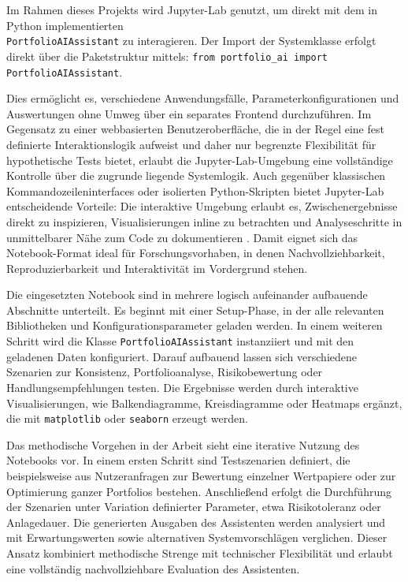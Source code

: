     Im Rahmen dieses Projekts wird Jupyter-Lab genutzt, um direkt mit dem in Python implementierten\\ \texttt{PortfolioAIAssistant} zu interagieren.
    Der Import der Systemklasse erfolgt direkt über die Paketstruktur mittels: \lstinline[columns=fixed]{from portfolio_ai import PortfolioAIAssistant}.

    Dies ermöglicht es, verschiedene Anwendungsfälle, Parameterkonfigurationen und Auswertungen ohne Umweg über ein separates Frontend durchzuführen.
    Im Gegensatz zu einer webbasierten Benutzeroberfläche, die in der Regel eine fest definierte Interaktionslogik aufweist und daher nur begrenzte Flexibilität für hypothetische Tests bietet, erlaubt die Jupyter-Lab-Umgebung eine vollständige Kontrolle über die zugrunde liegende Systemlogik.
    Auch gegenüber klassischen Kommandozeileninterfaces oder isolierten Python-Skripten bietet Jupyter-Lab entscheidende Vorteile:
    Die interaktive Umgebung erlaubt es, Zwischenergebnisse direkt zu inspizieren, Visualisierungen inline zu betrachten und Analyseschritte in unmittelbarer Nähe zum Code zu dokumentieren \autocite[S. 87 und 88]{kluyver2016jupyter}.
    Damit eignet sich das Notebook-Format ideal für Forschungsvorhaben, in denen Nachvollziehbarkeit, Reproduzierbarkeit und Interaktivität im Vordergrund stehen.

    Die eingesetzten Notebook sind in mehrere logisch aufeinander aufbauende Abschnitte unterteilt.
    Es beginnt mit einer Setup-Phase, in der alle relevanten Bibliotheken und Konfigurationsparameter geladen werden.
    In einem weiteren Schritt wird die Klasse \texttt{PortfolioAIAssistant} instanziiert und mit den geladenen Daten konfiguriert.
    Darauf aufbauend lassen sich verschiedene Szenarien zur Konsistenz, Portfolioanalyse, Risikobewertung oder Handlungsempfehlungen testen.
    Die Ergebnisse werden durch interaktive Visualisierungen, wie Balkendiagramme, Kreisdiagramme oder Heatmaps ergänzt, die mit \texttt{matplotlib} oder \texttt{seaborn} erzeugt werden.

    Das methodische Vorgehen in der Arbeit sieht eine iterative Nutzung des Notebooks vor.
    In einem ersten Schritt sind Testszenarien definiert, die beispielsweise aus Nutzeranfragen zur Bewertung einzelner Wertpapiere oder zur Optimierung ganzer Portfolios bestehen.
    Anschließend erfolgt die Durchführung der Szenarien unter Variation definierter Parameter, etwa Risikotoleranz oder Anlagedauer.
    Die generierten Ausgaben des Assistenten werden analysiert und mit Erwartungswerten sowie alternativen Systemvorschlägen verglichen.
    Dieser Ansatz kombiniert methodische Strenge mit technischer Flexibilität und erlaubt eine vollständig nachvollziehbare Evaluation des Assistenten.

